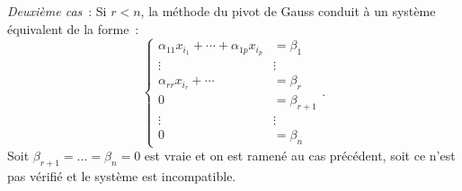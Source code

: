   \emph{Deuxième cas}~: Si \(r<n\), la méthode du pivot de Gauss conduit à un 
  système équivalent de la forme~:
  \begin{equation}
    \begin{cases}
      \alpha_{11}x_{i_1} + \dotsb + \alpha_{1p}x_{i_p} & = \beta_1 \\
      \vdots & \vdots \\    \alpha_{rr}x_{i_r} + \dotsb  & = \beta_r\\
      0 & = \beta_{r+1} \\
      \vdots & \vdots \\
      0 & = \beta_{n}
    \end{cases}.
  \end{equation}
  Soit \(\beta_{r+1}=\ldots=\beta_{n} = 0\) est vraie et on est ramené au cas 
  précédent, soit ce n'est pas vérifié et le système est incompatible.

